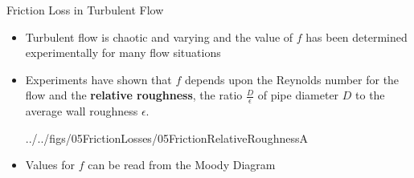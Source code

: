 \documentclass[9pt,xcolor=x11names,professionalfonts, mathserif]{beamer}
\begin{document}
											      					\begin{frame}{Friction Loss in Turbulent Flow}
											      						
											      						\begin{itemize}
											      							\item Turbulent flow is chaotic and varying and the value of $f$ has been determined experimentally
											      							      for many flow situations
											      							\item Experiments have shown that $f$ depends upon the Reynolds number for the flow and the \textbf{relative roughness},
											      							      the ratio $\tfrac{D}{\epsilon}$ of pipe diameter $D$ to the average wall roughness $\epsilon$.\par\medskip
											      							      \begin{cfig}[0.5]{../../figs/05FrictionLosses/05FrictionRelativeRoughnessA}\end{cfig}
											      							\item Values for $f$ can be read from the Moody Diagram
											      						\end{itemize}
											      					\end{frame}
											      					
\end{document}
